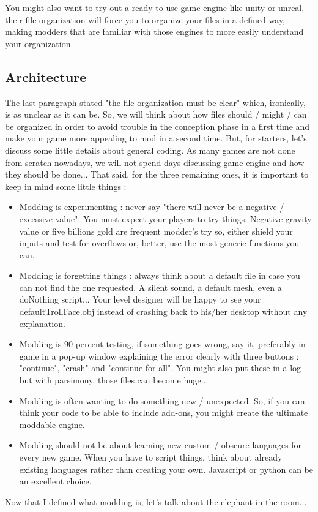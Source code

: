 \documentclass[a4paper,12pt]{article}
\begin{document}
You might also want to try out a ready to use game engine like unity or unreal, their file organization will force you to organize your files in a defined way, making modders that are familiar with those engines to more easily understand your organization.

\subsection{Architecture}
The last paragraph stated "the file organization must be clear" which, ironically, is as unclear as it can be. So, we will think about how files should / might / can be organized in order to avoid trouble in the conception phase in a first time and make your game more appealing to mod in a second time. But, for starters, let's discuss some little details about general coding.
As many games are not done from scratch nowadays, we will not spend days discussing game engine and how they should be done... That said, for the three remaining ones, it is important to keep in mind some little things :
\begin{itemize}
\item Modding is experimenting : never say "there will never be a negative / excessive value". You must expect your players to try things. Negative gravity value or five billions gold are frequent modder's try so, either shield your inputs and test for overflows or, better, use the most generic functions you can.
\item Modding is forgetting things : always think about a default file in case you can not find the one requested. A silent sound, a default mesh, even a doNothing script... Your level designer will be happy to see your defaultTrollFace.obj instead of crashing back to his/her desktop without any explanation.
\item Modding is 90 percent testing, if something goes wrong, say it, preferably in game in a pop-up window explaining the error clearly with three buttons : "continue", "crash" and "continue for all". You might also put these in a log but with parsimony, those files can become huge...
\item Modding is often wanting to do something new / unexpected. So, if you can think your code to be able to include add-ons, you might create the ultimate moddable engine.
\item Modding should not be about learning new custom / obscure languages for every new game. When you have to script things, think about already existing languages rather than creating your own. Javascript or python can be an excellent choice.
\end{itemize}
Now that I defined what modding is, let's talk about the elephant in the room...
\end{document}
